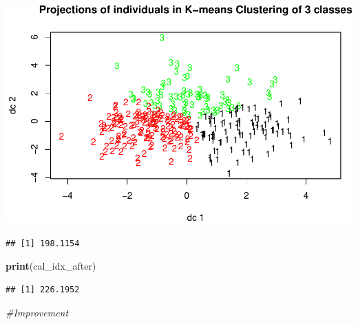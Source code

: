 \documentclass[]{article}
\newenvironment{Shaded}{\begin{snugshade}}{\end{snugshade}}
\newcommand{\KeywordTok}[1]{\textcolor[rgb]{0.13,0.29,0.53}{\textbf{#1}}}
\newcommand{\DataTypeTok}[1]{\textcolor[rgb]{0.13,0.29,0.53}{#1}}
\newcommand{\StringTok}[1]{\textcolor[rgb]{0.31,0.60,0.02}{#1}}
\newcommand{\CommentTok}[1]{\textcolor[rgb]{0.56,0.35,0.01}{\textit{#1}}}
\newcommand{\OperatorTok}[1]{\textcolor[rgb]{0.81,0.36,0.00}{\textbf{#1}}}
\newcommand{\NormalTok}[1]{#1}
\begin{document}
\includegraphics{project_report_files/figure-latex/unnamed-chunk-13-1.pdf}

\begin{Shaded}
\end{Shaded}

\begin{verbatim}
## [1] 198.1154
\end{verbatim}

\begin{Shaded}
\begin{Highlighting}[]
\KeywordTok{print}\NormalTok{(cal_idx_after)}
\end{Highlighting}
\end{Shaded}

\begin{verbatim}
## [1] 226.1952
\end{verbatim}

\begin{Shaded}
\begin{Highlighting}[]
\CommentTok{#Improvement}
\end{Highlighting}
\end{Shaded}
\end{document}
